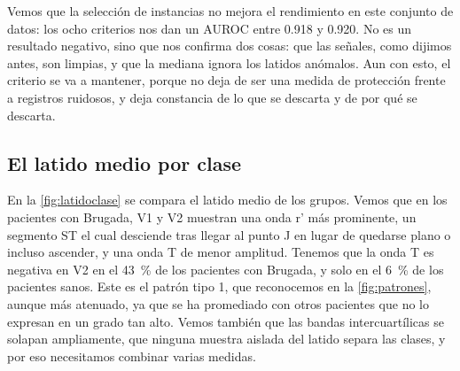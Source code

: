 Vemos que la selección de instancias no mejora el rendimiento en este conjunto de datos: los ocho criterios nos dan un AUROC entre \num{0.918} y \num{0.920}. No es un resultado negativo, sino que nos confirma dos cosas: que las señales, como dijimos antes, son limpias, y que la mediana ignora los latidos anómalos. Aun con esto, el criterio se va a mantener, porque no deja de ser una medida de protección frente a registros ruidosos, y deja constancia de lo que se descarta y de por qué se descarta.

\subsection{El latido medio por clase}

En la \cref{fig:latidoclase} se compara el latido medio de los grupos. Vemos que en los pacientes con Brugada, V1 y V2 muestran una onda r' más prominente, un segmento ST el cual desciende tras llegar al punto J en lugar de quedarse plano o incluso ascender, y una onda T de menor amplitud. Tenemos que la onda T es negativa en V2 en el \SI{43}{\percent} de los pacientes con Brugada, y solo en el \SI{6}{\percent} de los pacientes sanos. Este es el patrón tipo 1, que reconocemos en la \cref{fig:patrones}, aunque más atenuado, ya que se ha promediado con otros pacientes que no lo expresan en un grado tan alto. Vemos también que las bandas intercuartílicas se solapan ampliamente, que ninguna muestra aislada del latido separa las clases, y por eso necesitamos combinar varias medidas.

